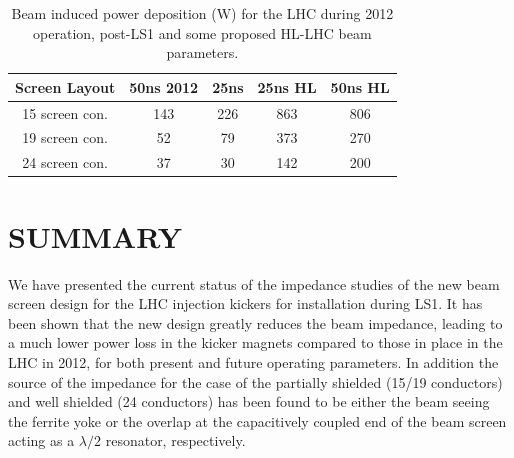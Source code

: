 \documentclass{JAC2003}
\begin{document}
\begin{table}
\caption{Beam induced power deposition (W) for the LHC during 2012 operation, post-LS1 and some proposed HL-LHC beam parameters.}
\label{tab:PowLoss}
\begin{center}
\begin{tabular}{c | c | c | c | c}
Screen Layout &50ns 2012&25ns&25ns HL&50ns HL\\ \hline
15 screen con. & 143 & 226 & 863 & 806 \\ \hline
19 screen con. & 52 & 79 & 373 & 270 \\ \hline
24 screen con. & 37 & 30 & 142 & 200 \\
\end{tabular}
\end{center}
\end{table}

\section{SUMMARY}

We have presented the current status of the impedance studies of the new beam screen design for the LHC injection kickers for installation during LS1. It has been shown that the new design greatly reduces the beam impedance, leading to a much lower power loss in the kicker magnets compared to those in place in the LHC in 2012, for both present and future operating parameters. In addition the source of the impedance for the case of the partially shielded (15/19 conductors) and well shielded (24 conductors) has been found to be either the beam seeing the ferrite yoke or the overlap at the capacitively coupled end of the beam screen acting as a $\lambda /2 $ resonator, respectively. 
\end{document}
